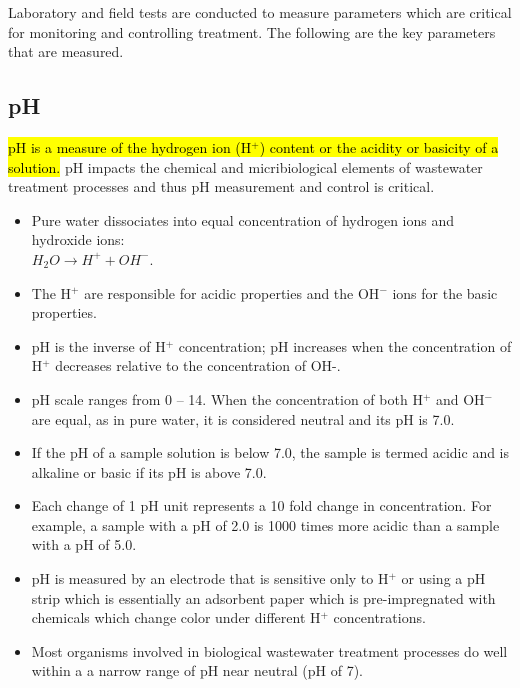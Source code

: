 		Laboratory and field tests are conducted to measure parameters which are critical for monitoring and controlling treatment.  The following are the key parameters that are measured.	
			
\subsection{pH}	
			\hl{pH is a measure of the hydrogen ion (H$^+$) content or the acidity or basicity of a solution.}  pH impacts the chemical and micribiological elements of wastewater treatment processes and thus pH measurement and control is critical.
			\begin{itemize}
				\item Pure water dissociates into equal concentration of hydrogen ions and hydroxide ions:\\ 
				      $H_2O \rightarrow H^+ + OH^-$.
				\item The H$^+$ are responsible for acidic properties and the OH$^-$ ions for the basic properties.  
				\item pH is the inverse of H$^+$ concentration; pH increases when the concentration of H$^+$ decreases relative to the concentration of OH-. 
				\item pH scale ranges from 0 – 14. When the concentration of both H$^+$ and OH$^-$ are equal, as in pure water, it is considered neutral and its pH is 7.0.  \item If the pH of a sample solution is below 7.0, the sample is termed acidic and is alkaline or basic if its pH is above 7.0. 
				\item Each change of 1 pH unit represents a 10 fold change in concentration.  For example, a sample with a pH of 2.0 is 1000 times more acidic than a sample with a pH of 5.0. 
				\item pH is measured by an electrode that is sensitive only to H$^+$ or using a pH strip which is essentially an adsorbent paper which is pre-impregnated with chemicals which change color under different H$^+$ concentrations.
				\item Most organisms involved in biological wastewater treatment processes do well within a a narrow range of pH near neutral (pH of 7).			
			\end{itemize}
			

